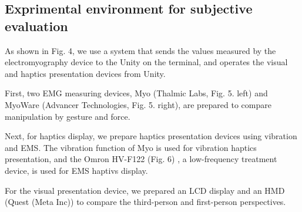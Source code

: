 \documentclass[letterpaper, 10 pt, conference]{ieeeconf}  %
\begin{document}
        \subsection{Exprimental environment for subjective evaluation}
                As shown in Fig. 4, we use a system that sends the values measured by the electromyography device to the Unity on the terminal, and operates the visual and haptics presentation devices from Unity.  

                First, two EMG measuring devices, Myo (Thalmic Labs, Fig. 5. left) and MyoWare (Advancer Technologies, Fig. 5. right), are prepared to compare manipulation by gesture and force.  

                Next, for haptics display, we prepare haptics presentation devices using vibration and EMS.  
                The vibration function of Myo is used for vibration haptics presentation, and the Omron HV-F122 (Fig. 6) , a low-frequency treatment device, is used for EMS haptivs display.  

                For the visual presentation device, we prepared an LCD display and an HMD (Quest (Meta Inc)) to compare the third-person and first-person perspectives.
\end{document}
